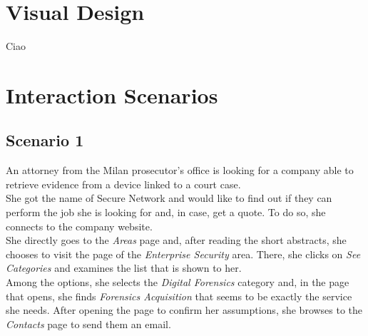 \documentclass[12pt]{report}
\begin{document}
\chapter{Visual Design}
Ciao 
%

\chapter{Interaction Scenarios}

\section{Scenario 1}
An attorney from the Milan prosecutor's office is looking for a company able to retrieve evidence from a device linked to a court case.\\
\noindent
She got the name of Secure Network and would like to find out if they can perform the job she is looking for and, in case, get a quote.
To do so, she connects to the company website.\\
\noindent
She directly goes to the \emph{Areas} page and, after reading the short abstracts, she chooses to visit the page of the \emph{Enterprise Security} area.
There, she clicks on \emph{See Categories} and examines the list that is shown to her.\\
\noindent
Among the options, she selects the \emph{Digital Forensics} category and, in the page that opens, she finds \emph{Forensics Acquisition} that seems to be exactly the service she needs.
After opening the page to confirm her assumptions, she browses to the \emph{Contacts} page to send them an email.
\end{document}
